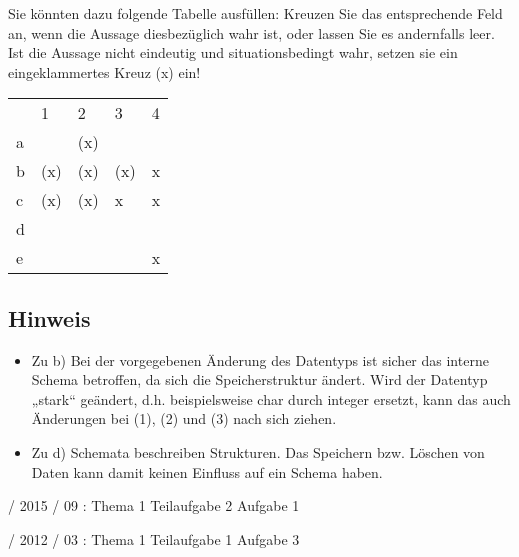 \documentclass{lehramt-informatik}
\begin{document}
\noindent
Sie könnten dazu folgende Tabelle ausfüllen: Kreuzen Sie das
entsprechende Feld an, wenn die Aussage diesbezüglich wahr ist, oder
lassen Sie es andernfalls leer. Ist die Aussage nicht eindeutig und
situationsbedingt wahr, setzen sie ein eingeklammertes Kreuz (x) ein!

\begin{antwort}[muster]
\begin{tabular}{lllll}
  &  1  &  2  & 3   & 4 \\
a &     & (x) &     &   \\
b & (x) & (x) & (x) & x \\
c & (x) & (x) &  x  & x \\
d &     &     &     &   \\
e &     &     &     & x
\end{tabular}

\subsection{Hinweis}

\begin{itemize}
\item Zu b) Bei der vorgegebenen Änderung des Datentyps ist sicher das
interne Schema betroffen, da sich die Speicherstruktur ändert. Wird der
Datentyp „stark“ geändert, d.h. beispielsweise char durch integer
ersetzt, kann das auch Änderungen bei (1), (2) und (3) nach sich ziehen.

\item Zu d) Schemata beschreiben Strukturen. Das Speichern bzw. Löschen
von Daten kann damit keinen Einfluss auf ein Schema haben.
\end{itemize}

\end{antwort}

%

 / 2015 / 09 : Thema 1 Teilaufgabe 2 Aufgabe 1

 / 2012 / 03 : Thema 1 Teilaufgabe 1 Aufgabe 3

\literatur
\end{document}
